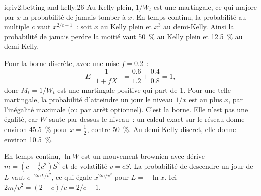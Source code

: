 \begin{solution}{iq:iv2:betting-and-kelly:26}
Au Kelly plein, $1/W_t$ est une martingale, ce qui majore par $x$ la probabilité de jamais tomber à $x$. En temps continu, la probabilité au multiple $c$ vaut $x^{2/c - 1}$~: soit $x$ au Kelly plein et $x^3$ au demi-Kelly. Ainsi la probabilité de jamais perdre la moitié vaut 50~\% au Kelly plein et 12.5~\% au demi-Kelly.

Pour la borne discrète, avec une mise $f = 0.2$~:
\[
E\left[\frac{1}{1 + fX}\right] = \frac{0.6}{1.2} + \frac{0.4}{0.8} = 1,
\]
donc $M_t = 1/W_t$ est une martingale positive qui part de 1. Pour une telle martingale, la probabilité d'atteindre un jour le niveau $1/x$ est au plus $x$, par l'inégalité maximale (ou par arrêt optionnel). C'est la borne. Elle n'est pas une égalité, car $W$ saute par-dessus le niveau~: un calcul exact sur le réseau donne environ 45.5~\% pour $x = \tfrac12$, contre 50~\%. Au demi-Kelly discret, elle donne environ 10.5~\%.

En temps continu, $\ln W$ est un mouvement brownien avec dérive $m = (c - \tfrac12 c^2)S^2$ et de volatilité $v = cS$. La probabilité de descendre un jour de $L$ vaut $e^{-2mL/v^2}$, ce qui égale $x^{2m/v^2}$ pour $L = -\ln x$. Ici $2m/v^2 = (2 - c)/c = 2/c - 1$.

\end{solution}

